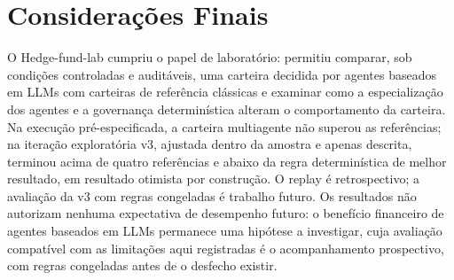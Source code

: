 \section{Considerações Finais}

O Hedge-fund-lab cumpriu o papel de laboratório: permitiu comparar, sob condições controladas e auditáveis, uma carteira decidida por agentes baseados em LLMs com carteiras de referência clássicas e examinar como a especialização dos agentes e a governança determinística alteram o comportamento da carteira. Na execução pré-especificada, a carteira multiagente não superou as referências; na iteração exploratória v3, ajustada dentro da amostra e apenas descrita, terminou acima de quatro referências e abaixo da regra determinística de melhor resultado, em resultado otimista por construção. O replay é retrospectivo; a avaliação da v3 com regras congeladas é trabalho futuro. Os resultados não autorizam nenhuma expectativa de desempenho futuro: o benefício financeiro de agentes baseados em LLMs permanece uma hipótese a investigar, cuja avaliação compatível com as limitações aqui registradas é o acompanhamento prospectivo, com regras congeladas antes de o desfecho existir.
